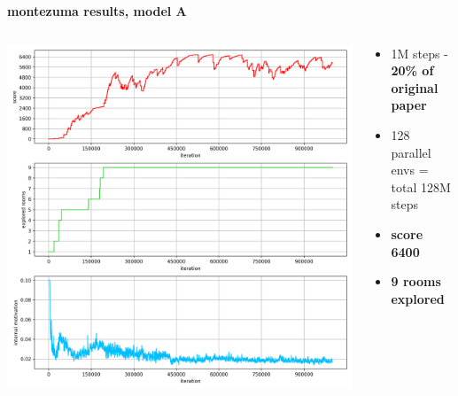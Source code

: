 \documentclass[xcolor=dvipsnames]{beamer}
\begin{document}
\begin{frame}{\bf montezuma results, model A}


\begin{columns}

    \begin{column}{0.5\textwidth}
      \includegraphics[scale=0.25]{../results/ppo_rnd_a_0.png}
    \end{column}

    \begin{column}{0.5\textwidth}
      \begin{itemize}
        \item 1M  steps - {\bf 20\% of original paper}
        \item 128 parallel envs = total 128M steps
        \item {\bf score 6400}
        \item {\bf 9 rooms explored}
      \end{itemize}
    \end{column}


\end{columns}


\end{frame}
\end{document}
